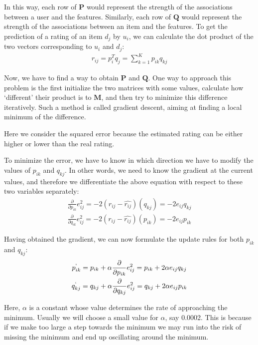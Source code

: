  In this way, each row of $\mathbf{P}$ would represent the strength of the associations between a user and the features. Similarly, each row of $\mathbf{Q}$ would represent the strength of the associations between an item and the features. To get the prediction of a rating of an item $d_j$ by $u_i$, we can calculate the dot product of the two vectors corresponding to $u_i$ and $d_j$:
  \begin{gather*}
    r_{ij} = p_i^{T}q_j = \sum_{k=1}^{K}p_{ik}q_{kj}
  \end{gather*}

 Now, we have to find a way to obtain $\mathbf{P}$ and $\mathbf{Q}$. One way to approach this problem is the first initialize the two matrices with some values, calculate how `different’ their product is to $\mathbf{M}$, and then try to minimize this difference iteratively. Such a method is called gradient descent, aiming at finding a local minimum of the difference.

 Here we consider the squared error because the estimated rating can be either higher or lower than the real rating.

 To minimize the error, we have to know in which direction we have to modify the values of $p_{ik}$ and $q_{kj}$. In other words, we need to know the gradient at the current values, and therefore we differentiate the above equation with respect to these two variables separately:
	\begin{gather*}
      \frac{\partial}{\partial p_{ik}}e_{ij}^2 = -2(r_{ij} - \widehat{r_{ij}})(q_{kj}) = -2e_{ij}q_{kj} \\
      \frac{\partial}{\partial q_{ik}}e_{ij}^2 = -2(r_{ij} - \widehat{r_{ij}})(p_{ik}) = -2e_{ij}p_{ik}
  \end{gather*}

 Having obtained the gradient, we can now formulate the update rules for both $p_{ik}$ and $q_{kj}$:
\begin{gather*}
      p^`_{ik} = p_{ik} + \alpha\frac{\partial}{\partial p_{ik}}e_{ij}^2 = p_{ik} + 2\alpha e_{ij}q_{kj} \\
      q^`_{kj} = q_{kj} + \alpha\frac{\partial}{\partial q_{kj}}e_{ij}^2 = q_{kj} + 2\alpha e_{ij}p_{ik}
  \end{gather*}

 Here, $\alpha$ is a constant whose value determines the rate of approaching the minimum. Usually we will choose a small value for $\alpha$, say 0.0002. This is because if we make too large a step towards the minimum we may run into the risk of missing the minimum and end up oscillating around the minimum.

